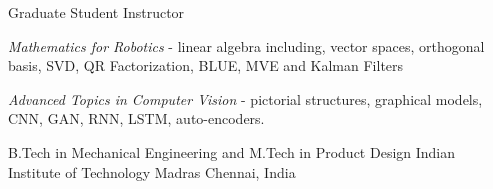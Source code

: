 \begin{cventries2}
\cventry
{Graduate Student Instructor} %
{} %
{} %
{} %
{
	\begin{cvitems} %
		\item {\emph{Mathematics for Robotics} - linear algebra including, vector spaces, orthogonal basis, SVD, QR Factorization, BLUE, MVE and Kalman Filters}
		\item {\emph{Advanced Topics in Computer Vision} - pictorial structures, graphical models, CNN, GAN, RNN, LSTM, auto-encoders. }
	\end{cvitems}
}
\vspace{0.2cm}
\cventry
{B.Tech in Mechanical Engineering and M.Tech in Product Design} %
{Indian Institute of Technology Madras} %
{Chennai, India} %
{} %
{}
\vspace{-0.5cm}
\end{cventries2}




